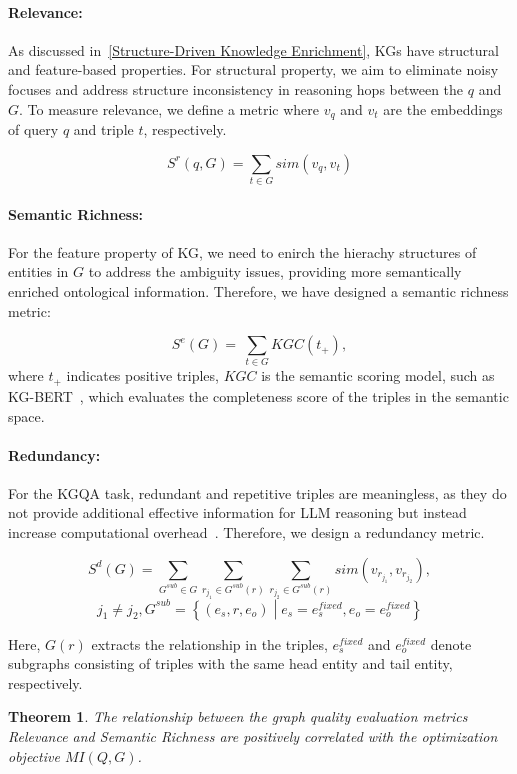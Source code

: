 \documentclass[11pt]{article}
\newtheorem{theorem}{Theorem}
\begin{document}
\paragraph{Relevance:} As discussed in~\ref{Structure-Driven Knowledge Enrichment}, KGs have structural and feature-based properties. For structural property, we aim to eliminate noisy focuses and address structure inconsistency in reasoning hops between the $q$ and $G$. To measure relevance, we define a metric where $v_q$ and $v_t$ are the embeddings of query $q$ and triple $t$, respectively.

{\small
\[S^{r}(q,G) = {\sum\limits_{t \in G}{sim\left( v_{q},v_{t} \right)}}\]
}

\paragraph{Semantic Richness:} For the feature property of KG, we need to enirch the hierachy structures of entities in $G$ to address the ambiguity issues, providing more semantically enriched ontological information. Therefore, we have designed a semantic richness metric:

{\small
\[S^{e}(G) = ~{\sum\limits_{t \in G}{KGC\left( t_{+} \right)}},\]
}
where $ t_{+} $ indicates positive triples, $KGC$ is the semantic scoring model, such as KG-BERT~\cite{yao2019kgbertbertknowledgegraph}, which evaluates the completeness score of the triples in the semantic space.

\paragraph{Redundancy:} For the KGQA task, redundant and repetitive triples are meaningless, as they do not provide additional effective information for LLM reasoning but instead increase computational overhead~\cite{liao-etal-2025-skintern,liu-etal-2024-lost,yuan2024hybridragcomprehensiveenhancement}. Therefore, we design a redundancy metric.

{\small
\[S^{d}(G) = {\sum\limits_{G^{sub} \in G}{{\sum\limits_{r_{j_{1}} \in G^{sub}(r)}{\sum\limits_{r_{j_{2}} \in G^{sub}(r)}{sim\left( {v_{r_{j_{1}}},v_{r_{j_{2}}}} \right)}}},}}\]
}
{\small
\textit{
\[{j_{1} \neq j_{2},G}^{sub} = \left\{ \left( e_{s},r,e_{o} \right) \middle| e_{s} = e_{s}^{fixed},e_{o} = e_{o}^{fixed} \right\}\]
}
}


Here, $G(r)$ extracts the relationship in the triples, $e_{s}^{fixed}$ and $e_{o}^{fixed}$ denote subgraphs consisting of triples with the same head entity and tail entity, respectively.
\begin{theorem}
The relationship between the graph quality evaluation metrics Relevance and Semantic Richness are positively correlated with the optimization objective $  MI(Q, G)  $.
\end{theorem}
\end{document}
